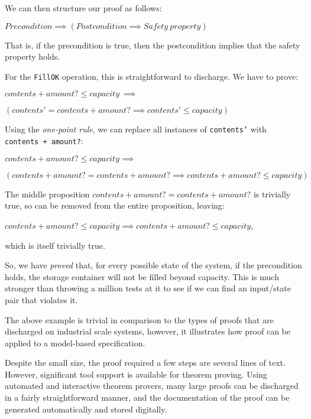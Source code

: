 \begin{example}
\begin{itemize}
\end{itemize}

We can then structure our proof as follows:

\begin{center}
$Precondition \implies (Postcondition \implies Safety\ property)$
\end{center}

That is, if the precondition is true, then the postcondition implies that the safety property holds.

For the \texttt{FillOK} operation, this is straightforward to discharge. We have to prove:

\quad  $contents + amount? \leq capacity ~\implies$

\vspace{-2mm}

\quad\quad $(contents' = contents + amount? \implies contents' \leq capacity)$

Using the \emph{one-point rule}, we can replace all instances of \texttt{contents'} with \texttt{contents + amount?}: 

\quad  $contents + amount? \leq capacity \implies~$

\vspace{-2mm}

\quad\quad $(contents + amount? = contents + amount? \implies contents + amount? \leq capacity)$

The middle proposition $contents + amount? = contents + amount?$ is trivially true, so can be removed from the entire proposition, leaving:

\quad  $contents + amount? \leq capacity \implies contents + amount? \leq capacity $,

which is itself trivially true.

So, we have \emph{proved} that, for every possible state of the system, if the precondition holds, the storage container will not be filled beyond capacity. This is much stronger than throwing a million tests at it to see if we can find an input/state pair that violates it.

\end{example}

The above example is trivial in comparison to the types of proofs that are discharged on industrial scale systems, however, it illustrates how proof can be applied to a model-based specification.

Despite the small size, the proof required a few steps are several lines of text.  However, significant tool support is available for theorem proving. Using automated and interactive theorem provers, many large proofs can be discharged in a fairly straightforward manner, and the documentation of the proof can be generated automatically and stored digitally.


